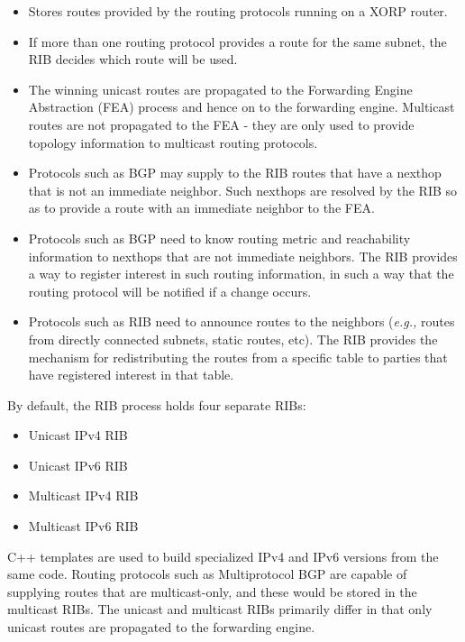 \documentclass[11pt]{article}
\newcommand{\eg}{\emph{e.g.,}\xspace}
\begin{document}
\begin{itemize}

  \item Stores routes provided by the routing protocols running on a XORP
  router.

  \item If more than one routing protocol provides a route for the same
  subnet, the RIB decides which route will be used.

  \item The winning unicast routes are propagated to the Forwarding
  Engine Abstraction (FEA) process and hence on to the forwarding
  engine. Multicast routes are not propagated to the FEA - they are only
  used to provide topology information to multicast routing protocols.

  \item Protocols such as BGP may supply to the RIB routes that have a
  nexthop that is not an immediate neighbor.  Such nexthops are resolved
  by the RIB so as to provide a route with an immediate neighbor to the
  FEA.

  \item Protocols such as BGP need to know routing metric and
  reachability information to nexthops that are not immediate neighbors.
  The RIB provides a way to register interest in such routing
  information, in such a way that the routing protocol will be notified
  if a change occurs.

  \item Protocols such as RIB need to announce routes to the neighbors
  (\eg routes from directly connected subnets, static routes, etc).
  The RIB provides the mechanism for redistributing the routes from
  a specific table to parties that have registered interest in that
  table.

\end{itemize}

By default, the RIB process holds four separate RIBs:

\begin{itemize}
  \item Unicast IPv4 RIB
  \item Unicast IPv6 RIB
  \item Multicast IPv4 RIB
  \item Multicast IPv6 RIB
\end{itemize}

C++ templates are used to build specialized IPv4 and IPv6 versions
from the same code.  Routing protocols such as Multiprotocol BGP are
capable of supplying routes that are multicast-only, and these would
be stored in the multicast RIBs.  The unicast and multicast RIBs
primarily differ in that only unicast routes are propagated to the
forwarding engine.
\end{document}
